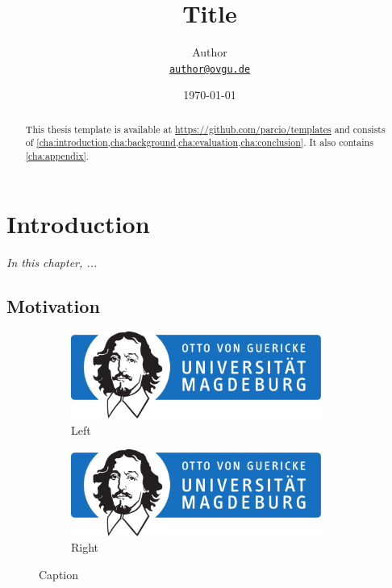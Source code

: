 \documentclass[
	12pt,
	a4paper,
	abstract,
	bibliography=totoc,
	chapterprefix,
	headings=openright,
	numbers=endperiod,
	parskip=half,
	twoside,
]{scrreprt}
\title{Title}
\author{
Author\\
{\large\href{mailto:author@ovgu.de}{\nolinkurl{author@ovgu.de}}}
}
\date{\today}
\begin{document}
{}

\maketitle

\begin{abstract}
\lipsum[1]

This thesis template is available at \url{https://github.com/parcio/templates} and consists of \cref{cha:introduction,cha:background,cha:evaluation,cha:conclusion}.
It also contains \cref{cha:appendix}.
\end{abstract}

\tableofcontents

\cleardoubleoddpage
{}

\chapter{Introduction}
\label{cha:introduction}

\textit{In this chapter, ...}

\section{Motivation}

\begin{figure}[ht]
	\centering
	\begin{subfigure}{0.45\textwidth}
		\centering
		\includegraphics[width=0.9\textwidth]{OVGU-INF}
		\caption{Left}
		\label{fig:left}
	\end{subfigure}
	\begin{subfigure}{0.45\textwidth}
		\centering
		\includegraphics[width=0.9\textwidth]{OVGU-INF}
		\caption{Right}
		\label{fig:right}
	\end{subfigure}
	\caption{Caption}
	\label{fig:both}
\end{figure}
\end{document}
